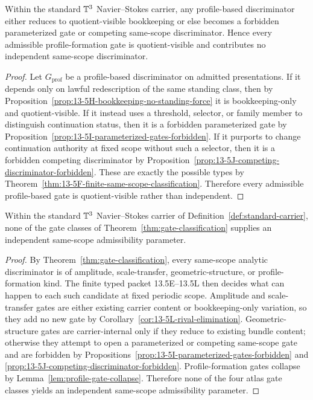 \begin{lemma}
\label{lem:profile-gate-collapse}
Within the standard $\mathbb{T}^3$ Navier--Stokes carrier, any profile-based discriminator either reduces to
quotient-visible bookkeeping or else becomes a forbidden parameterized gate or competing
same-scope discriminator. Hence every admissible profile-formation gate is quotient-visible and
contributes no independent same-scope discriminator.
\end{lemma}

\begin{proof}
Let $G_{\mathrm{prof}}$ be a profile-based discriminator on admitted presentations. If it depends only
on lawful redescription of the same standing class, then by
Proposition~\ref{prop:13-5H-bookkeeping-no-standing-force} it is bookkeeping-only and quotient-visible.
If it instead uses a threshold, selector, or family member to distinguish continuation status, then it
is a forbidden parameterized gate by Proposition~\ref{prop:13-5I-parameterized-gates-forbidden}. If
it purports to change continuation authority at fixed scope without such a selector, then it is a
forbidden competing discriminator by Proposition~\ref{prop:13-5J-competing-discriminator-forbidden}.
These are exactly the possible types by Theorem~\ref{thm:13-5F-finite-same-scope-classification}.
Therefore every admissible profile-based gate is quotient-visible rather than independent.
\end{proof}

\begin{theorem}
\label{thm:gate-exhaustion}
Within the standard $\mathbb{T}^3$ Navier--Stokes carrier of Definition~\ref{def:standard-carrier}, none of
the gate classes of Theorem~\ref{thm:gate-classification} supplies an independent same-scope
admissibility parameter.
\end{theorem}

\begin{proof}
By Theorem~\ref{thm:gate-classification}, every same-scope analytic discriminator is of amplitude,
scale-transfer, geometric-structure, or profile-formation kind. The finite typed packet
13.5E--13.5L then decides what can happen to each such candidate at fixed periodic scope.
Amplitude and scale-transfer gates are either existing carrier content or bookkeeping-only variation,
so they add no new gate by Corollary~\ref{cor:13-5L-rival-elimination}. Geometric-structure gates are
carrier-internal only if they reduce to existing bundle content; otherwise they attempt to open a
parameterized or competing same-scope gate and are forbidden by
Propositions~\ref{prop:13-5I-parameterized-gates-forbidden} and
\ref{prop:13-5J-competing-discriminator-forbidden}. Profile-formation gates collapse by
Lemma~\ref{lem:profile-gate-collapse}. Therefore none of the four atlas gate classes yields an
independent same-scope admissibility parameter.
\end{proof}

